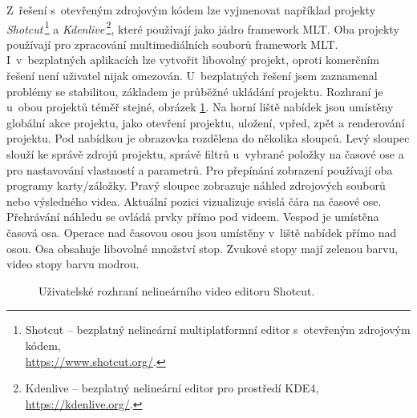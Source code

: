 Z~řešení s~otevřeným zdrojovým kódem lze vyjmenovat například projekty \textit{Shotcut}\,\footnote{Shotcut -- bezplatný nelineární multiplatformní editor s~otevřeným zdrojovým kódem,\\\url{https://www.shotcut.org/}.} a \textit{Kdenlive}\,\footnote{Kdenlive -- bezplatný nelineární editor pro prostředí KDE4, \url{https://kdenlive.org/}.}, které používají jako jádro framework MLT. Oba projekty používají pro zpracování multimediálních souborů framework MLT. I~v~bezplatných aplikacích lze vytvořit libovolný projekt, oproti komerčním řešení není uživatel nijak omezován. U~bezplatných řešení jsem zaznamenal problémy se stabilitou, základem je průběžné ukládání projektu. Rozhraní je u~obou projektů téměř stejné, obrázek \ref{img:shotcut}. Na horní liště nabídek jsou umístěny globální akce projektu, jako otevření projektu, uložení, vpřed, zpět a renderování projektu. Pod nabídkou je obrazovka rozdělena do několika sloupců. Levý sloupec slouží ke správě zdrojů projektu, správě filtrů u~vybrané položky na časové ose a pro nastavování vlastností a parametrů. Pro přepínání zobrazení používají oba programy karty/záložky. Pravý sloupec zobrazuje náhled zdrojových souborů nebo výsledného videa. Aktuální pozici vizualizuje svislá čára na časové ose. Přehrávání náhledu se ovládá prvky přímo pod videem. Vespod je umístěna časová osa. Operace nad časovou osou jsou umístěny v~liště nabídek přímo nad osou. Osa obsahuje libovolné množství stop. Zvukové stopy mají zelenou barvu, video stopy barvu modrou.
\begin{figure}[h]
	\centering
	\caption{Uživatelské rozhraní nelineárního video editoru Shotcut.}\label{img:shotcut}
\end{figure}

